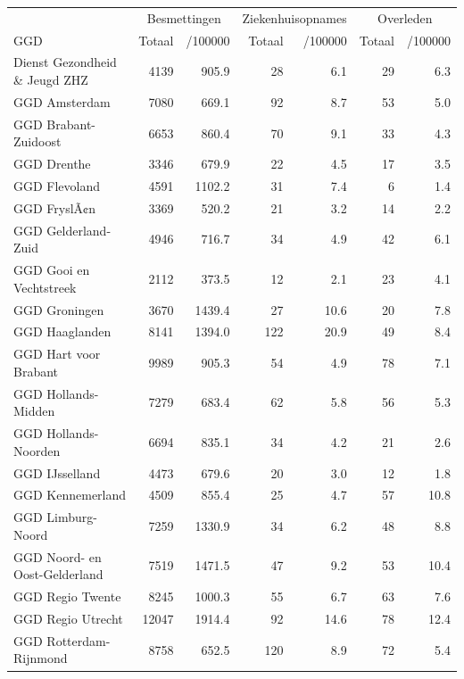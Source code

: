 \documentclass[
  english,
  man,floatsintext]{apa6}
\begin{document}
\begin{table}[H]
\centering\begingroup\fontsize{10}{12}\selectfont

\begin{threeparttable}
\begin{tabular}{lrrrrrr}
\toprule
\multicolumn{1}{c}{ } & \multicolumn{2}{c}{Besmettingen} & \multicolumn{2}{c}{Ziekenhuisopnames} & \multicolumn{2}{c}{Overleden} \\
\cmidrule(l{3pt}r{3pt}){2-3} \cmidrule(l{3pt}r{3pt}){4-5} \cmidrule(l{3pt}r{3pt}){6-7}
GGD & Totaal & /100000 & Totaal & /100000 & Totaal & /100000\\
\midrule
Dienst Gezondheid \& Jeugd ZHZ & 4139 & 905.9 & 28 & 6.1 & 29 & 6.3\\
GGD Amsterdam & 7080 & 669.1 & 92 & 8.7 & 53 & 5.0\\
GGD Brabant-Zuidoost & 6653 & 860.4 & 70 & 9.1 & 33 & 4.3\\
GGD Drenthe & 3346 & 679.9 & 22 & 4.5 & 17 & 3.5\\
GGD Flevoland & 4591 & 1102.2 & 31 & 7.4 & 6 & 1.4\\
GGD FryslÃ¢n & 3369 & 520.2 & 21 & 3.2 & 14 & 2.2\\
GGD Gelderland-Zuid & 4946 & 716.7 & 34 & 4.9 & 42 & 6.1\\
GGD Gooi en Vechtstreek & 2112 & 373.5 & 12 & 2.1 & 23 & 4.1\\
GGD Groningen & 3670 & 1439.4 & 27 & 10.6 & 20 & 7.8\\
GGD Haaglanden & 8141 & 1394.0 & 122 & 20.9 & 49 & 8.4\\
GGD Hart voor Brabant & 9989 & 905.3 & 54 & 4.9 & 78 & 7.1\\
GGD Hollands-Midden & 7279 & 683.4 & 62 & 5.8 & 56 & 5.3\\
GGD Hollands-Noorden & 6694 & 835.1 & 34 & 4.2 & 21 & 2.6\\
GGD IJsselland & 4473 & 679.6 & 20 & 3.0 & 12 & 1.8\\
GGD Kennemerland & 4509 & 855.4 & 25 & 4.7 & 57 & 10.8\\
GGD Limburg-Noord & 7259 & 1330.9 & 34 & 6.2 & 48 & 8.8\\
GGD Noord- en Oost-Gelderland & 7519 & 1471.5 & 47 & 9.2 & 53 & 10.4\\
GGD Regio Twente & 8245 & 1000.3 & 55 & 6.7 & 63 & 7.6\\
GGD Regio Utrecht & 12047 & 1914.4 & 92 & 14.6 & 78 & 12.4\\
GGD Rotterdam-Rijnmond & 8758 & 652.5 & 120 & 8.9 & 72 & 5.4\\

\end{tabular}
\end{threeparttable}
\end{table}
\end{document}
